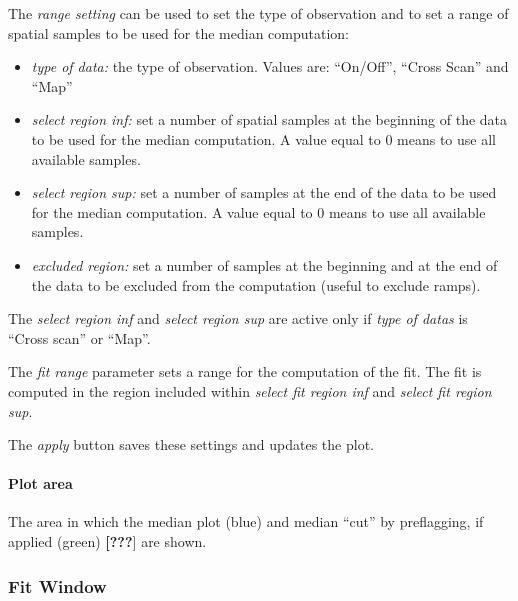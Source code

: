 \documentclass[letterpaper,10pt,english]{sphinxmanual}
\begin{document}
The \emph{range setting} can be used to set the type of observation and to set a range of spatial samples to be used for the median computation:
\begin{itemize}
\item {} 
\emph{type of data:} the type of observation. Values are: ``On/Off'', ``Cross Scan'' and ``Map''

\item {} 
\emph{select region inf:} set a number of spatial samples at the beginning of the data to be used for the median computation. A value equal to 0 means to use all available samples.

\item {} 
\emph{select region sup:} set a number of samples at the end of the data to be used for the median computation. A value equal to 0 means to use all available samples.

\item {} 
\emph{excluded region:} set a number of samples at the beginning and at the end of the data to be excluded from the computation (useful to exclude ramps).

\end{itemize}

The \emph{select region inf} and \emph{select region sup} are active only if \emph{type of datas} is ``Cross scan'' or ``Map''.

The \emph{fit range} parameter sets a range for the computation of the fit.
The fit is computed in the region included within \emph{select fit region inf} and \emph{select fit region sup}.

The \emph{apply} button saves these settings and updates the plot.


\paragraph{Plot area}
\label{guibp:plot-area}
The area in which the median plot (blue) and median ``cut'' by preflagging, if applied (green) \textbf{{[}???}{]} are shown.



\subsubsection{Fit Window}
\label{guibp:fit-window}
\end{document}
